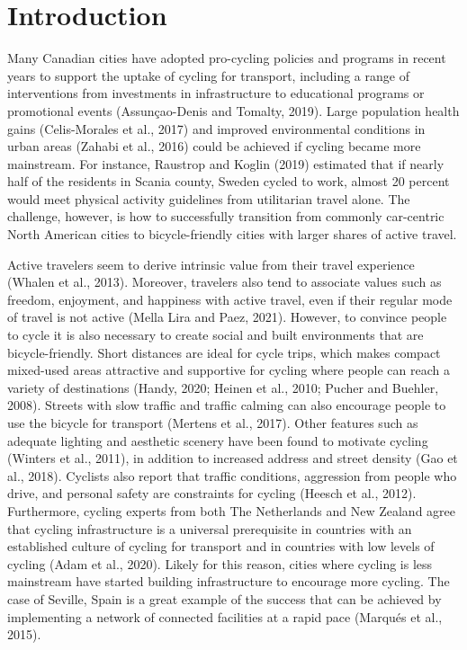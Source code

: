 \documentclass[]{elsarticle} %
\begin{document}
\newpage

\hypertarget{sec:introduction}{%
\section{Introduction}\label{sec:introduction}}

Many Canadian cities have adopted pro-cycling policies and programs in
recent years to support the uptake of cycling for transport, including a
range of interventions from investments in infrastructure to educational
programs or promotional events (Assunçao-Denis and Tomalty, 2019). Large
population health gains (Celis-Morales et al., 2017) and improved
environmental conditions in urban areas (Zahabi et al., 2016) could be
achieved if cycling became more mainstream. For instance, Raustrop and
Koglin (2019) estimated that if nearly half of the residents in Scania
county, Sweden cycled to work, almost 20 percent would meet physical
activity guidelines from utilitarian travel alone. The challenge,
however, is how to successfully transition from commonly car-centric
North American cities to bicycle-friendly cities with larger shares of
active travel.

Active travelers seem to derive intrinsic value from their travel
experience (Whalen et al., 2013). Moreover, travelers also tend to
associate values such as freedom, enjoyment, and happiness with active
travel, even if their regular mode of travel is not active (Mella Lira
and Paez, 2021). However, to convince people to cycle it is also
necessary to create social and built environments that are
bicycle-friendly. Short distances are ideal for cycle trips, which makes
compact mixed-used areas attractive and supportive for cycling where
people can reach a variety of destinations (Handy, 2020; Heinen et al.,
2010; Pucher and Buehler, 2008). Streets with slow traffic and traffic
calming can also encourage people to use the bicycle for transport
(Mertens et al., 2017). Other features such as adequate lighting and
aesthetic scenery have been found to motivate cycling (Winters et al.,
2011), in addition to increased address and street density (Gao et al.,
2018). Cyclists also report that traffic conditions, aggression from
people who drive, and personal safety are constraints for cycling
(Heesch et al., 2012). Furthermore, cycling experts from both The
Netherlands and New Zealand agree that cycling infrastructure is a
universal prerequisite in countries with an established culture of
cycling for transport and in countries with low levels of cycling (Adam
et al., 2020). Likely for this reason, cities where cycling is less
mainstream have started building infrastructure to encourage more
cycling. The case of Seville, Spain is a great example of the success
that can be achieved by implementing a network of connected facilities
at a rapid pace (Marqués et al., 2015).
\end{document}
